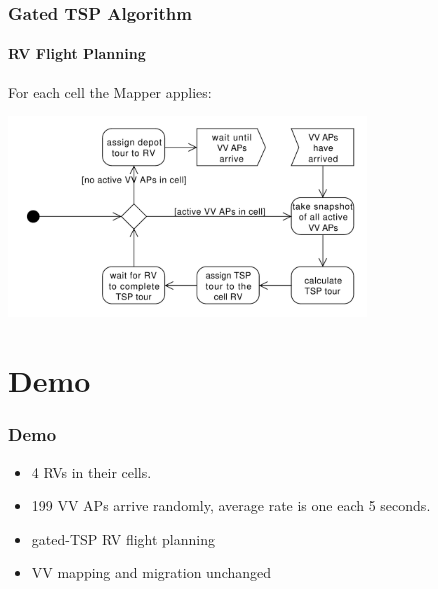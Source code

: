 \documentclass{beamer}
\begin{document}
\begin{frame}\frametitle{Gated TSP Algorithm}\framesubtitle{RV Flight Planning }
% 
% 

For each cell the Mapper applies:

        \begin{center}
                {\includegraphics[width=9.5cm]{policy-2.pdf}}
        \end{center}

\end{frame}

\section{Demo}

\begin{frame}\frametitle{Demo} %

  \begin{itemize}
    \item 4 RVs in their cells. 
    \item 199 VV APs arrive randomly, average rate is one each 5 seconds.
    \item gated-TSP RV flight planning
    \item VV mapping and migration unchanged
  \end{itemize}

\end{frame}
\end{document}

